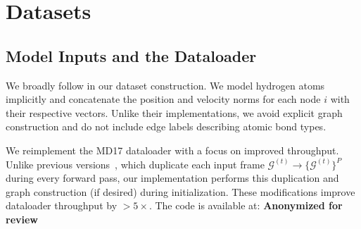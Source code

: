 

\section{Datasets}
\label{sec:dataset_construction}
\subsection{Model Inputs and the Dataloader}
We broadly follow \cite{shi_learning_2021, xu_equivariant_2024} in our dataset construction. We model hydrogen atoms implicitly and concatenate the position and velocity norms for each node \(i\) with their respective vectors. Unlike their implementations, we avoid explicit graph construction and do not include edge labels describing atomic bond types.

We reimplement the MD17 dataloader with a focus on improved throughput. Unlike previous versions~\cite{huang_equivariant_2022, xu_equivariant_2024}, which duplicate each input frame \(\mathcal{G}^{(t)} \to \{\mathcal{G}^{(t)}\}^{P}\) during every forward pass, our implementation performs this duplication and graph construction (if desired) during initialization. These modifications improve dataloader throughput by \(>5 \times\). The code is available at: \textbf{Anonymized for review}

